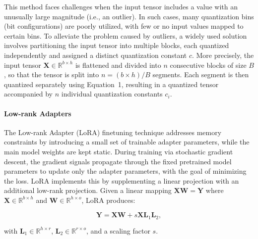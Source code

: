 This method faces challenges when the input tensor includes a value with an unusually large magnitude (i.e., an outlier). In such cases, many quantization bins (bit configurations) are poorly utilized, with few or no input values mapped to certain bins. To alleviate the problem caused by outliers, a widely used solution involves partitioning the input tensor into multiple blocks, each quantized independently and assigned a distinct quantization constant $c$. More precisely, the input tensor $\mathbf{X}\in \mathbb{R}^{b\times h}$ is flattened and divided into $n$ consecutive blocks of size $B$, so that the tensor is split into ${n = ({b\times h} )/{B} }$ segments. Each segment is then quantized separately using Equation~1, resulting in a quantized tensor accompanied by $n$ individual quantization constants $c_i$.

\paragraph{Low-rank Adapters} The Low-rank Adapter (LoRA) finetuning technique \citep{hu2021lora} addresses memory constraints by introducing a small set of trainable adapter parameters, while the main model weights are kept static. During training via stochastic gradient descent, the gradient signals propagate through the fixed pretrained model parameters to update only the adapter parameters, with the goal of minimizing the loss. LoRA implements this by supplementing a linear projection with an additional low-rank projection. Given a linear mapping ${\mathbf{X} \mathbf{W} = \mathbf{Y}}$ where $\mathbf{X}\in  \mathbb{R}^{b\times h}$ and $\mathbf{W}\in  \mathbb{R}^{h\times o}$, LoRA produces:

\begin{equation}
    \mathbf{Y} = \mathbf{X}\mathbf{W} + s\mathbf{X}\mathbf{L}_1\mathbf{L}_2,
\end{equation}

with $\mathbf{L}_1\in  \mathbb{R}^{h\times r}$, $\mathbf{L}_2\in  \mathbb{R}^{r\times o}$, and a scaling factor $s$.


